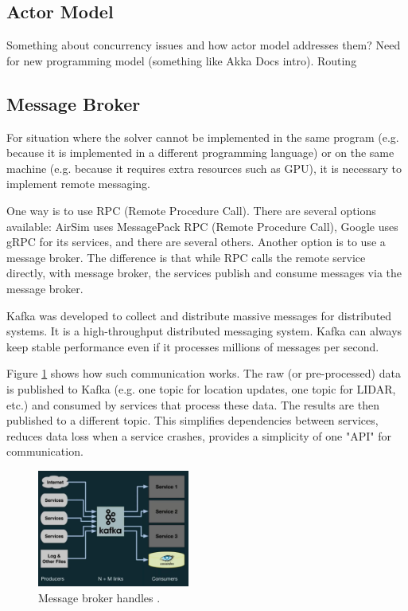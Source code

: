 \documentclass{article}
\begin{document}
\subsection{Actor Model}
Something about concurrency issues and how actor model addresses them?
Need for new programming model (something like Akka Docs intro).
Routing



\subsection{Message Broker}
For situation where the solver cannot be implemented in the same program (e.g. because it is implemented in a different programming language) or on the same machine (e.g. because it requires extra resources such as GPU), it is necessary to implement remote messaging.
 
One way is to use RPC (Remote Procedure Call). There are several options available: AirSim uses MessagePack RPC (Remote Procedure Call), Google uses gRPC for its services, and there are several others. Another option is to use a message broker. The difference is that while RPC calls the remote service directly, with message broker, the services publish and consume messages via the message broker.

Kafka was developed to collect and distribute massive messages for distributed systems. It is a high-throughput distributed messaging system. Kafka can always keep stable performance even if it processes millions of messages per second. \cite{wang2015kafka}

Figure \ref{fig:after-kafka} shows how such communication works. The raw (or pre-processed) data is published to Kafka (e.g. one topic for location updates, one topic for LIDAR, etc.) and consumed by services that process these data. The results are then published to a different topic. This simplifies dependencies between services, reduces data loss when a service crashes, provides a simplicity of one "API" for communication.



\begin{figure}
	\centering
	\includegraphics[width=5cm]{after-kafka}
	\caption{Message broker handles  .}\label{fig:after-kafka}
\end{figure}
\end{document}
